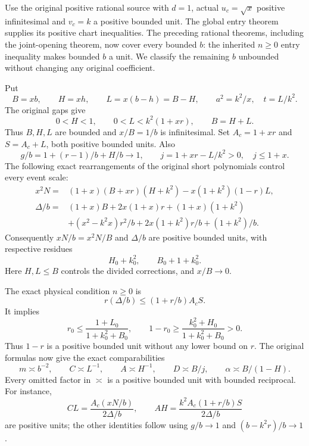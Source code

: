 \label{pb60046a37191:sec:c2-unbounded-b-reduction}

Use the original positive rational source with $d=1$, actual
$u_c=\sqrt x$ positive infinitesimal and $v_c=k$ a positive bounded
unit. The global entry theorem supplies its positive chart inequalities.
The preceding rational theorems, including the joint-opening theorem,
now cover every bounded $b$: the inherited $n\ge0$ entry inequality
makes bounded $b$ a unit. We classify the remaining $b$ unbounded
without changing any original coefficient.

Put
\[
 B=xb,\qquad H=xh,\qquad L=x(b-h)=B-H,\qquad
 a^2=k^2/x,\quad t=L/k^2.
\]
The original gaps give
\[
 0<H<1,\qquad0<L<k^2(1+xr),\qquad B=H+L.
\]
Thus $B,H,L$ are bounded and $x/B=1/b$ is infinitesimal.
Set $A_c=1+xr$ and $S=A_c+L$, both positive bounded units. Also
\[
 g/b=1+(r-1)/b+H/b\longrightarrow1,
 \qquad j=1+xr-L/k^2>0,\quad j\le1+x.
\]
The following exact rearrangements of the original short polynomials
control every event scale:
\begin{align*}
 x^2N={}&(1+x)(B+xr)(H+k^2)-x(1+k^2)(1-r)L,\\
 \Delta/b={}&(1+x)B+2x(1+x)r+(1+x)(1+k^2)\\
 &+(x^2-k^2x)r^2/b+2x(1+k^2)r/b+(1+k^2)/b.
\end{align*}
Consequently $xN/b=x^2N/B$ and $\Delta/b$ are positive bounded
units, with respective residues
\[
 H_0+k_0^2,\qquad B_0+1+k_0^2.
\]
Here $H,L\le B$ controls the divided corrections, and $x/B\to0$.

The exact physical condition $n\ge0$ is
\[
 r(\Delta/b)\le(1+r/b)A_cS.
\]
It implies
\[
 r_0\le\frac{1+L_0}{1+k_0^2+B_0},\qquad
 1-r_0\ge\frac{k_0^2+H_0}{1+k_0^2+B_0}>0.
\]
Thus $1-r$ is a positive bounded unit without any lower bound on $r$.
The original formulas now give the exact comparabilities
\[
 m\asymp b^{-2},\qquad C\asymp L^{-1},\qquad A\asymp H^{-1},
 \qquad D\asymp B/j,\qquad\alpha\asymp B/(1-H).
 \tag{SR1}
\]
Every omitted factor in $\asymp$ is a positive bounded unit with
bounded reciprocal. For instance,
\[
 CL=\frac{A_c(xN/b)}{2\Delta/b},\qquad
 AH=\frac{k^2A_c(1+r/b)S}{2\Delta/b}
\]
are positive units; the other identities follow using $g/b\to1$
and $(b-k^2r)/b\to1$.

